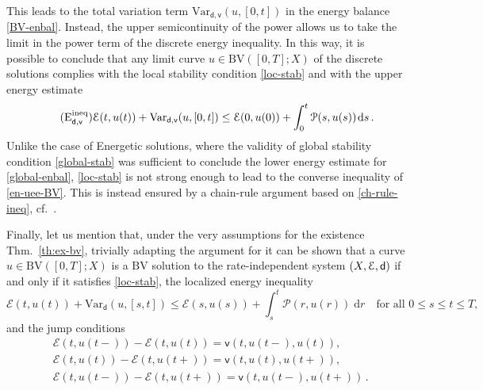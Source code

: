 \documentclass[a4paper,10pt,reqno]{amsart} %
\numberwithin{equation}{section}
\def\dd{\;\!\mathrm{d}} %
\newcommand{\Xs}{X}
\newcommand{\BV}{\mathrm{BV}}
\newcommand{\mdn}{\mathsf{d}}
\newcommand{\ene}[2]{\mathcal{E}(#1,#2)}
\newcommand{\pw}[2]{\mathcal{P}(#1,#2)}
\newcommand{\Vari}[4]{\mathrm{Var}_{#1}(#2,[#3,#4])}
\newcommand{\lli}[2]{{#1}({#2}{-})}
\newcommand{\rli}[2]{{#1}({#2}{+})}
\newcommand{\bvcostname}{\mathsf{v}}
\newcommand{\bvcost}[3]{\mathsf{v}(#1,#2,#3)}
\newcommand{\RIS}{(\Xs,\calE,\mdn)}
\newcommand{\RRR}{\color{red}}
\newcommand{\EEE}{\color{black}}
\begin{document}
  This leads to the total variation term $\Vari{\mdn,\bvcostname}{u}0t$ in the energy balance \eqref{BV-enbal}. 
   Instead, the upper semicontinuity of the power allows us to take the limit in the power term of the 
   discrete energy inequality.  In this way, it is possible to conclude that 
 any limit curve $u\in \BV([0,T];\Xs)$ of the discrete solutions complies with the local stability condition 
 \eqref{loc-stab} %
   and with   the  upper energy estimate 
 \begin{equation}
 \label{en-uee-BV}
 \tag{$\mathrm{E}_{\mdn,\bvcostname}^{\mathrm{ineq}}$}
 \ene t{u(t)} + \Vari {\mdn,\bvcostname}{u}0{t} \leq \ene 0{u(0)} +\int_0^t \pw s{u(s)} \dd s\,.%
 \end{equation} 
Unlike the case of Energetic solutions, where the validity of  global stability condition \eqref{global-stab}  was sufficient to conclude  the  lower energy estimate for \eqref{global-enbal}, \eqref{loc-stab} is  not strong enough to lead to the converse inequality of \eqref{en-uee-BV}. This is instead ensured by a chain-rule argument based on \eqref{ch-rule-ineq}, cf.\  \cite[Prop.\ 4.2, Thm.\ 4.3]{MRS12}. 
\par
Finally, let us mention that,
under the very  assumptions for the existence Thm.\  \ref{th:ex-bv},
 trivially adapting the argument for \cite[Thm.\ 3.15]{MRS13} it can be shown that 
a curve $u\in \BV([0,T];\Xs)$ is a $\BV$ solution to the rate-independent system $\RIS $ if and only if it satisfies  \eqref{loc-stab}, the localized energy inequality 
\begin{equation}
\label{localized-enineq}
\ene t{u(t)} + \Vari {\mdn}{u}s{t} \leq \ene s{u(s)} +\int_s^t \pw r{u(r)} \dd r \quad \text{for all } 0 \leq s \leq t \leq T,
\end{equation}
and the jump conditions 
\begin{equation}
\begin{aligned}
\label{bv-jump-cond}
&
\ene t{\lli u t } - \ene t{u(t)} = \bvcost t{\lli ut}{u(t)},
\\
&
\ene t{ u (t) } - \ene t{\rli u t } = \bvcost t{u(t)}{\rli u t},
\\
&
\ene t{\lli u t } - \ene t{\rli ut}  = \bvcost t{\lli ut}{\rli u t}\,.
\end{aligned}
\end{equation}


\end{document}
